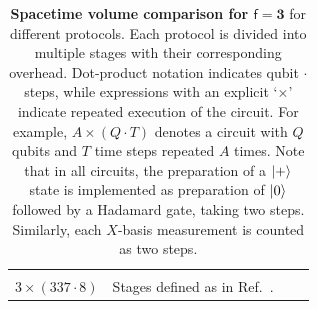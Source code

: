 \documentclass[%
    aps, 
    physrev,
    reprint,
]{revtex4-2}
\newcommand{\fd}[1]{\mathsf{f}=#1}
\begin{document}
\begin{table}
\begin{tabular}{|c|l|l|l|}
{                $17 \cdot 4$ \\
                $3\times (337 \cdot 8)$} &
    Stages defined as in Ref.~\cite{vaknin2025magic}.\\ \hline  
    \end{tabular}
    \caption{\textbf{Spacetime volume comparison for $\boldsymbol{\fd3}$} for different protocols. 
    Each protocol is divided into multiple stages with their corresponding overhead. 
    Dot-product notation indicates qubit $\cdot$ steps, while expressions with an explicit `$\times$' indicate repeated execution of the circuit. 
    For example, $A\times(Q\cdot T)$ denotes a circuit with $Q$ qubits and $T$ time steps repeated $A$ times. 
    Note that in all circuits, the preparation of a $\ket{+}$ state is implemented as preparation of $\ket{0}$ followed by a Hadamard gate, taking two steps. 
    Similarly, each $X$-basis measurement is counted as two steps.}
    \label{table: STV fd3 summary}
\end{table}
\end{document}
